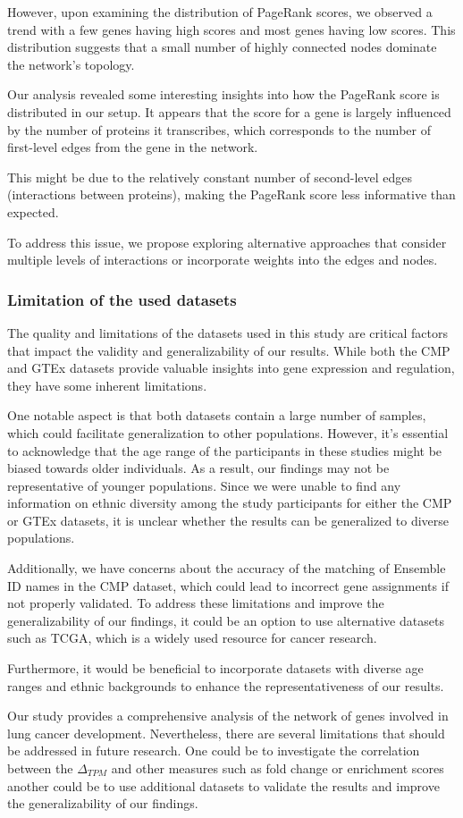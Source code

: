 However, upon examining the distribution of PageRank scores, we observed a trend with a few genes having high scores
and most genes having low scores.
This distribution suggests that a small number of highly connected nodes dominate the network's topology.

Our analysis revealed some interesting insights into how the PageRank score is distributed in our setup.
It appears that the score for a gene is largely influenced by the number of proteins it transcribes,
which corresponds to the number of first-level edges from the gene in the network.

This might be due to the relatively constant number of second-level edges (interactions between proteins),
making the PageRank score less informative than expected.

To address this issue, we propose exploring alternative approaches that consider multiple levels of interactions
or incorporate weights into the edges and nodes.

\subsubsection*{Limitation of the used datasets} \label{subsubsec:limit_base_data}

The quality and limitations of the datasets used in this study are critical factors that impact the validity and generalizability of our results.
While both the CMP and GTEx datasets provide valuable insights into gene expression and regulation,
they have some inherent limitations.

One notable aspect is that both datasets contain a large number of samples,
which could facilitate generalization to other populations.
However, it's essential to acknowledge that the age range of the participants in these studies might be biased towards older individuals.
As a result, our findings may not be representative of younger populations.
Since we were unable to find any information on ethnic diversity among the study participants for either the CMP or GTEx datasets,
it is unclear whether the results can be generalized to diverse populations.

Additionally, we have concerns about the accuracy of the matching of Ensemble ID names in the CMP dataset,
which could lead to incorrect gene assignments if not properly validated.
To address these limitations and improve the generalizability of our findings,
it could be an option to use alternative datasets such as TCGA, which is a widely used resource for cancer research.

Furthermore, it would be beneficial to incorporate datasets with diverse age ranges
and ethnic backgrounds to enhance the representativeness of our results.


Our study provides a comprehensive analysis of the network of genes involved in lung cancer development.
Nevertheless, there are several limitations that should be addressed in future research.
One could be to investigate the correlation between the $\Delta_{TPM}$ and other measures such as fold change or enrichment scores
another could be to use additional datasets to validate the results and improve the generalizability of our findings.\\